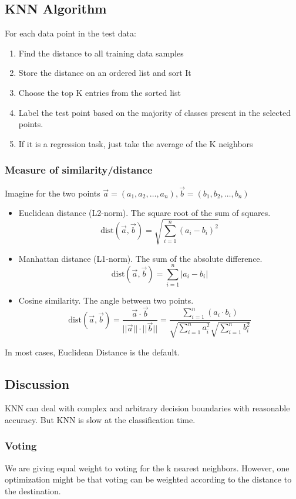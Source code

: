 \documentclass[letterpaper,12pt]{article}
\begin{document}
\subsection{KNN Algorithm}
For each data point in the test data:
\begin{enumerate}
    \item Find the distance to all training data samples
    \item Store the distance on an ordered list and sort It
    \item Choose the top K entries from the sorted list
    \item Label the test point based on the majority of classes present in the selected points.
    \item If it is a regression task, just take the average of the K neighbors
\end{enumerate}
\subsubsection{Measure of similarity/distance}
Imagine for the two points $\vec{a}=(a_1,a_2,\ldots,a_n),\vec{b}=(b_1,b_2,\ldots,b_n)$
\begin{itemize}
    \item Euclidean distance (L2-norm). The square root of the sum of squares.\[\text{dist}(\vec{a},\vec{b})=\sqrt{\sum_{i=1}^{n}(a_i-b_i)^2}\]
    \item Manhattan distance (L1-norm). The sum of the absolute difference. \[\text{dist}(\vec{a},\vec{b})=\sum_{i=1}^{n}|a_i-b_i|\]
    \item Cosine similarity. The angle between two points.
    \[\text{dist}(\vec{a},\vec{b})=\frac{\vec{a}\cdot\vec{b}}{||\vec{a}||\cdot||\vec{b}||}=\frac{\sum_{i=1}^{n}(a_i\cdot b_i)}{\sqrt{\sum_{i=1}^{n}a_i^2}\sqrt{\sum_{i=1}^{n}b_i^2}}\]
\end{itemize}
In most cases, Euclidean Distance is the default. 

\subsection{Discussion}

KNN can deal with complex and arbitrary decision boundaries with reasonable accuracy. But KNN is slow at the classification time.

\subsubsection{Voting}
We are giving equal weight to voting for the k nearest neighbors. However, one optimization might be that voting can be weighted according to the distance to the destination. 
\end{document}
